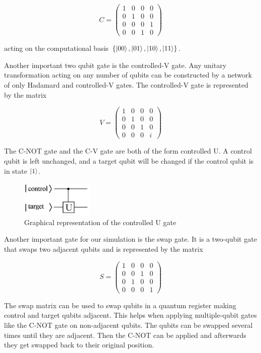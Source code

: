\begin{equation}
 C = \begin{pmatrix}
	1 & 0 & 0 & 0 \\
 	0 & 1 & 0 & 0 \\
	0 & 0 & 0 & 1 \\
	0 & 0 & 1 & 0
 	\end{pmatrix}
\end{equation}

\noindent acting on the computational basis \(\{\left| 00 \right>,\left| 01 \right>,\left| 10 \right>,\left| 11 \right>\}\).

Another important two qubit gate is the controlled-V gate. Any unitary transformation acting on any number of qubits can be constructed by a network of only Hadamard and controlled-V gates. The controlled-V gate is represented by the matrix

\begin{equation}
 V = \begin{pmatrix}
	1 & 0 & 0 & 0 \\
 	0 & 1 & 0 & 0 \\
	0 & 0 & 1 & 0 \\
	0 & 0 & 0 & i
	 \end{pmatrix}
\end{equation}

The C-NOT gate and the C-V gate are both of the form controlled U. A control qubit is left unchanged, and a target qubit will be changed if the control qubit is in state \(\left| 1 \right>\).

\begin{figure}[H]
	\centering
	\includegraphics[width=35mm]{./images/cugate}
	\caption{Graphical representation of the controlled U gate}
\end{figure}

Another important gate for our simulation is the swap gate. It is a two-qubit gate that swaps two adjacent qubits and is represented by the matrix

\begin{equation}
 S = \begin{pmatrix}
	1 & 0 & 0 & 0 \\
 	0 & 0 & 1 & 0 \\
	0 & 1 & 0 & 0 \\
	0 & 0 & 0 & 1
 \end{pmatrix}
\end{equation}

The swap matrix can be used to swap qubits in a quantum register making control and target qubits adjacent. This helps when applying multiple-qubit gates like the C-NOT gate on non-adjacent qubits. The qubits can be swapped several times until they are adjacent. Then the C-NOT can be applied and afterwards they get swapped back to their original position. \cite{ekert2000, stolze2008}